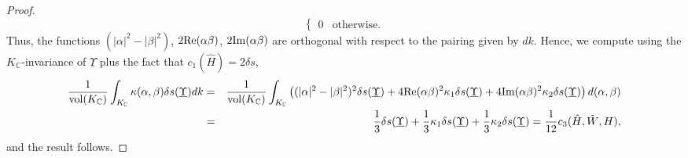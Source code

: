 \documentclass{amsart}
\theoremstyle{definition}
\theoremstyle{remark}
\numberwithin{equation}{section}
\newcommand{\C}{{\mathbb C}}
\begin{document}
\begin{proof}
\[\begin{cases}
0&\mbox{otherwise.} \end{cases}
\]
Thus, the functions $(|\alpha|^2-|\beta|^2)$, $2{\rm Re}(\alpha\beta)$, $2{\rm Im}(\alpha\beta)$ are orthogonal with respect to the pairing given by $dk$. Hence, we compute using the $K_\C$-invariance of $\underline \Upsilon$ plus the fact that $c_1(\hat H)=2\delta s$,
\begin{eqnarray*}
\frac{1}{{\rm vol}(K_\C)}\int_{K_\C}\kappa(\alpha,\beta)\delta s(\underline{\Upsilon})dk&=&\frac{1}{{\rm vol}(K_\C)}\int_{K_\C}\left((|\alpha|^2-|\beta|^2)^2\delta s(\underline{\Upsilon})+4{\rm Re}(\alpha\beta)^2\kappa_1\delta s(\underline{\Upsilon})+4{\rm Im}(\alpha\beta)^2\kappa_2\delta s(\underline{\Upsilon})\right)d(\alpha,\beta)\\
&=&\frac{1}{3}\delta s(\underline{\Upsilon})+\frac{1}{3}\kappa_1\delta s(\underline{\Upsilon})+\frac{1}{3}\kappa_2\delta s(\underline{\Upsilon})=\frac{1}{12}c_3(\hat H,\tilde W,H),
\end{eqnarray*}
and the result follows.
\end{proof}
\end{document}
